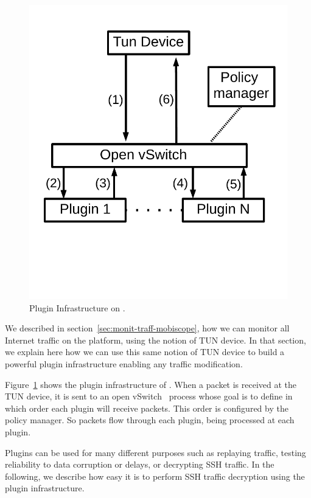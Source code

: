 \begin{figure}
\begin{center}
\includegraphics[width=0.8\columnwidth]{figures/packet-monitoring-plugin.pdf}
\end{center}
\caption{Plugin Infrastructure on \platname.}
\label{fig:packet-monitoring-solution}
\end{figure}

We described in section~\ref{sec:monit-traff-mobiscope}, how we can
monitor all Internet traffic on the \platname{} platform, using the
notion of TUN device. In that section, we explain here how we can use
this same notion of TUN device to build a powerful plugin
infrastructure enabling any traffic modification.

Figure~\ref{fig:packet-monitoring-solution} shows the plugin
infrastructure of \platname. When a packet is received at the TUN
device, it is sent to an open vSwitch~\cite{Openvswitch} process whose
goal is to define in which order each plugin will receive
packets. This order is configured by the policy manager. So packets
flow through each plugin, being processed at each plugin. 

Plugins can be used for many different purposes such as replaying
traffic, testing reliability to data corruption or delays, or
decrypting SSH traffic. In the following, we describe how easy it is
to perform SSH traffic decryption using the \platname{} plugin
infrastructure.

